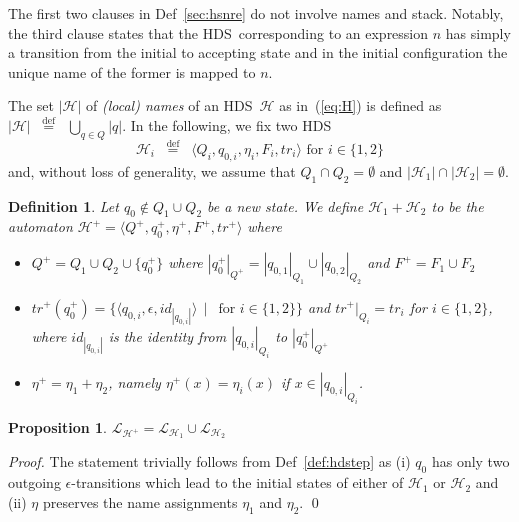 \documentclass[runningheads,a4paper]{llncs}
\newcommand{\longversion}[1]{#1}
\newcommand{\trans}{\mathit{tr}}
\newcommand{\emptystr}{\epsilon}
\newcommand{\lang}[1]{\mathcal{L}_{#1}}
\newcommand{\weight}[1]{|#1|}
\newcommand{\st}{\ \ \big| \ \ }
\newcommand{\mmdef}{\mbox{$\;\;\stackrel{\mathrm{def}}{=}\;\;$}}
\newcommand{\hdns}{HDS}
\newtheorem{definition}{Theorem}[section]
\newtheorem{proposition}{Theorem}[section]
\newtheorem{definition}{Definition}[section]
\newtheorem{proposition}{Proposition}[section]
\newcommand{\tuple}[1]{\langle#1\rangle}
\newcommand{\hdtr}[3]{\tuple{#2,#1,#3}}
\begin{document}
The first two clauses in Def~\ref{sec:hsnre} do not involve names and
stack.
Notably, the third clause states that the \hdns\ corresponding to an
expression $n$ has simply a transition from the initial to accepting
state and in the initial configuration the unique name of the former
is mapped to $n$.

The set $\weight{\mathcal H}$ of \emph{(local) names} of an \hdns\
$\mathcal H$ as in~(\ref{eq:H}) is defined as $\weight{\mathcal H}
\mmdef \bigcup_{q \in Q} \weight q$.
In the following, we fix two \hdns
\begin{equation}\label{twohdns:eq}
  \mathcal H_i \mmdef \tuple{Q_i,q_{0,i}, \eta_i, F_i, \trans_i} \text{ for } i \in \{1,2\}
\end{equation}
and, without loss of generality, we assume that $Q_1 \cap Q_2 = \emptyset$
and $\weight{\mathcal H_1} \cap \weight{\mathcal H_2} = \emptyset$.

\begin{definition}\label{def:hdsum}
  Let $q_0 \not\in Q_1 \cup Q_2$ be a new state.
We define $\mathcal H_1 + \mathcal H_2$ to be the automaton
  $\mathcal H^+ = \tuple{Q^+,q_0^+,\eta^+,F^+,\trans^+}$ where
  \begin{itemize}
  \item $Q^+ = Q_1 \cup Q_2 \cup \{q_0^+\}$ where
    $\weight{q_0^+}_{Q^+} = \weight{q_{0,1}}_{Q_1} \cup
    \weight{q_{0,2}}_{Q_2}$ and $F^+ = F_1 \cup F_2$
  \item $\trans^+(q_0^+) = \{\hdtr \emptystr {q_{0,i}} {id_{\weight{q_{0,i}}}} \st \text{ for } i \in \{1,2\}\}$ and $\trans^+|_{Q_i} = \trans_i$ for $i \in \{1,2\}$, where $id_{\weight{q_{0,i}}}$ is the identity from $\weight{q_{0,i}}_{Q_i}$ to $\weight{q^+_0}_{Q^+}$
  \item $\eta^+ = \eta_1 + \eta_2$, namely $\eta^+(x) = \eta_i(x)$ if
    $x \in \weight{q_{0,i}}_{Q_i}$.
  \end{itemize}
\end{definition}
\begin{proposition}\label{prop:hdsum}
  $\lang{\mathcal{H^+}} = \lang{\mathcal H_1} \cup \lang{\mathcal H_2}$
\end{proposition}
\longversion{
  \begin{proof}
    The statement trivially follows from Def~\ref{def:hdstep} as
    (i)
    $q_0$ has only two outgoing $\emptystr$-transitions which lead
    to the initial states of either of $\mathcal H_1$ or $\mathcal H_2$
    and (ii)
    $\eta$ preserves the name assignments $\eta_1$ and $\eta_2$.
    \qed
  \end{proof}
}
\end{document}
